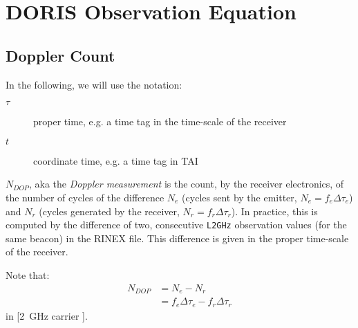 \section{DORIS Observation Equation}
\label{sec:doris-observation-equation}

\subsection{Doppler Count}
\label{ssec:doppler-count}
In the following, we will use the notation:
\begin{description}
  \item[$\tau$] proper time, e.g. a time tag in the time-scale of the receiver
  \item[$t$] coordinate time, e.g. a time tag in TAI
\end{description}

$N_{DOP}$, aka the \emph{Doppler measurement} is the count, by the receiver 
electronics, of the number of cycles of the difference $N_e$ (cycles sent by the 
emitter, $N_e=f_e \Delta \tau_e$) and $N_r$ (cycles generated by the receiver, 
$N_r=f_r \Delta \tau_r$). In practice, this is computed by the difference of two, 
consecutive \texttt{L2GHz} observation values (for the same beacon) in the 
RINEX file. This difference is given in the proper time-scale of the receiver.

Note that:
\begin{equation}
  \begin{split}
    N_{DOP} & = N_e - N_r\\
            & = f_e \Delta\tau_e - f_r \Delta\tau_r 
  \end{split}
\end{equation}
in [\SI{2}{\GHz} carrier \si{\cycles}].

